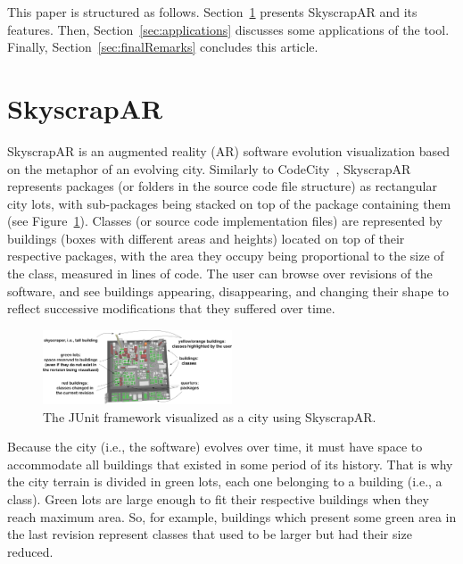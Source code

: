 
This paper is structured as follows. Section~\ref{sec:skyscrapar} presents SkyscrapAR and its features. Then, Section~\ref{sec:applications} discusses some applications of the tool. Finally, Section~\ref{sec:finalRemarks} concludes this article.

\section{SkyscrapAR} \label{sec:skyscrapar}
SkyscrapAR is an augmented reality (AR) software evolution visualization based on the metaphor of an evolving city. Similarly to CodeCity~\cite{wettel:2008}, SkyscrapAR represents packages (or folders in the source code file structure) as rectangular city lots, with sub-packages being stacked on top of the package containing them (see Figure~\ref{fig:sample_junit}). Classes (or source code implementation files) are represented by buildings (boxes with different areas and heights) located on top of their respective packages, with the area they occupy being proportional to the size of the class, measured in lines of code. The user can browse over revisions of the software, and see buildings appearing, disappearing, and changing their shape to reflect successive modifications that they suffered over time.

\begin{figure}[ht!]
 \centering
 \includegraphics[width=0.5\textwidth, bb=0 0 1214 477]{./images/infographic}
 \caption{The JUnit framework visualized as a city using SkyscrapAR.}
 \label{fig:sample_junit}
\end{figure}

Because the city (i.e., the software) evolves over time, it must have space to accommodate all buildings that existed in some period of its history. That is why the city terrain is divided in green lots, each one belonging to a building (i.e., a class). Green lots are large enough to fit their respective buildings when they reach maximum area. So, for example, buildings which present some green area in the last revision represent classes that used to be larger but had their size reduced.

